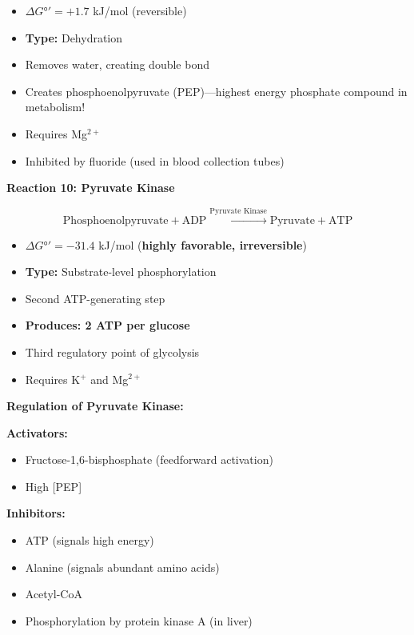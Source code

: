 \begin{itemize}
    \item $\Delta G°' = +1.7$ kJ/mol (reversible)
    \item \textbf{Type:} Dehydration
    \item Removes water, creating double bond
    \item Creates phosphoenolpyruvate (PEP)—highest energy phosphate compound in metabolism!
    \item Requires Mg$^{2+}$
    \item Inhibited by fluoride (used in blood collection tubes)
\end{itemize}

\textbf{Reaction 10: Pyruvate Kinase}

\[
\text{Phosphoenolpyruvate} + \text{ADP} \xrightarrow{\text{Pyruvate Kinase}} \text{Pyruvate} + \text{ATP}
\]

\begin{itemize}
    \item $\Delta G°' = -31.4$ kJ/mol (\textbf{highly favorable, irreversible})
    \item \textbf{Type:} Substrate-level phosphorylation
    \item Second ATP-generating step
    \item \textbf{Produces: 2 ATP per glucose}
    \item Third regulatory point of glycolysis
    \item Requires K$^+$ and Mg$^{2+}$
\end{itemize}

\begin{theorem}
\textbf{Regulation of Pyruvate Kinase:}

\textbf{Activators:}
\begin{itemize}
    \item Fructose-1,6-bisphosphate (feedforward activation)
    \item High [PEP]
\end{itemize}

\textbf{Inhibitors:}
\begin{itemize}
    \item ATP (signals high energy)
    \item Alanine (signals abundant amino acids)
    \item Acetyl-CoA
    \item Phosphorylation by protein kinase A (in liver)
\end{itemize}
\end{theorem}

